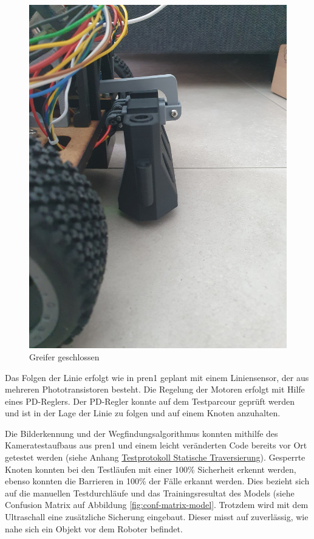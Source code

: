 \begin{figure}[H]
\begin{minipage}[b]{0.49\textwidth}
  \includegraphics[width=\textwidth, angle=-90]{assets/MT/greifer-close.jpg}
  \caption{Greifer geschlossen}
  \label{fig:griefe-rclose}
\end{minipage}
\end{figure}

Das Folgen der Linie erfolgt wie in \acrshort{pren1} geplant mit einem Liniensensor, der aus mehreren Phototransistoren besteht. Die Regelung der Motoren erfolgt mit Hilfe eines PD-Reglers. Der PD-Regler konnte auf dem Testparcour geprüft werden und ist in der Lage der Linie zu folgen und auf einem Knoten anzuhalten.


Die Bilderkennung und der Wegfindungsalgorithmus konnten mithilfe des Kameratestaufbaus aus \acrshort{pren1} und einem leicht veränderten Code bereits vor Ort getestet werden (siehe Anhang \hyperlink{statische-traver.1}{Testprotokoll Statische Traversierung}). Gesperrte Knoten konnten bei den Testläufen mit einer 100\% Sicherheit erkennt werden, ebenso konnten die Barrieren in 100\% der Fälle erkannt werden. Dies bezieht sich auf die manuellen Testdurchläufe und das Trainingsresultat des Models (siehe Confusion Matrix auf Abbildung \ref{fig:conf-matrix-model}. Trotzdem wird mit dem Ultraschall eine zusätzliche Sicherung eingebaut. Dieser misst auf \pm 1cm zuverlässig, wie nahe sich ein Objekt vor dem Roboter befindet.

